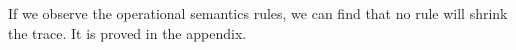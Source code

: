 
If we observe the operational semantics rules, we can find that no rule will shrink the trace. It is proved in the appendix.

